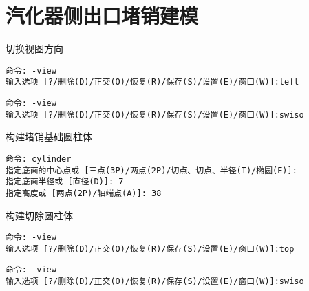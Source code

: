 \section{汽化器侧出口堵销建模}
\begin{procedure}
\item 切换视图方向

\begin{lstlisting}
命令: -view 
输入选项 [?/删除(D)/正交(O)/恢复(R)/保存(S)/设置(E)/窗口(W)]:left
\end{lstlisting}

\begin{lstlisting}
命令: -view 
输入选项 [?/删除(D)/正交(O)/恢复(R)/保存(S)/设置(E)/窗口(W)]:swiso 
\end{lstlisting}
\item 构建堵销基础圆柱体
\begin{lstlisting}
命令: cylinder
指定底面的中心点或 [三点(3P)/两点(2P)/切点、切点、半径(T)/椭圆(E)]:
指定底面半径或 [直径(D)]: 7
指定高度或 [两点(2P)/轴端点(A)]: 38
\end{lstlisting}

\item 构建切除圆柱体

\begin{lstlisting}
命令: -view 
输入选项 [?/删除(D)/正交(O)/恢复(R)/保存(S)/设置(E)/窗口(W)]:top
\end{lstlisting}

\begin{lstlisting}
命令: -view 
输入选项 [?/删除(D)/正交(O)/恢复(R)/保存(S)/设置(E)/窗口(W)]:swiso 
\end{lstlisting}


\end{procedure}
